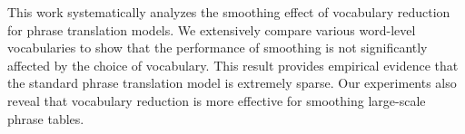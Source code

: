 This work systematically analyzes the smoothing effect of vocabulary reduction for phrase translation models. We extensively compare various word-level vocabularies to show that the performance of smoothing is not significantly affected by the choice of vocabulary. This result provides empirical evidence that the standard phrase translation model is extremely sparse. Our experiments also reveal that vocabulary reduction is more effective for smoothing large-scale phrase tables.
